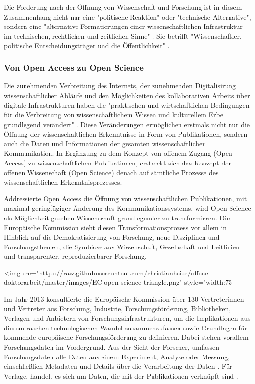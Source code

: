 Die Forderung nach der Öffnung von Wissenschaft und Forschung ist in diesem Zusammenhang nicht nur eine "politische Reaktion" oder "technische Alternative", sondern eine "alternative Formatierungen einer wissenschaftlichen Infrastruktur im technischen, rechtlichen und zeitlichen Sinne" \cite{kelty_2004}. Sie betrifft "Wissenschaftler, politische Entscheidungsträger und die Öffentlichkeit" \cite{Scheliga_2014}.

\subsubsection{Von Open Access zu Open Science}

Die zunehmenden Verbreitung des Internets, der zunehmenden Digitalisirung wissenschaftlicher Abläufe und den Möglichkeiten des kollaborativen Arbeits über digitale Infrastrukturen haben die "praktischen und wirtschaftlichen Bedingungen für die Verbreitung von wissenschaftlichem Wissen und kulturellem Erbe grundlegend verändert" \cite{berliner_erklaerung_2003}. Diese Veränderungen ermöglichen erstmals nicht nur die Öffnung der wissenschaftlichen Erkenntnisse in Form von Publikationen, sondern auch die Daten und Informationen der gesamten wissenschaftlicher Kommunikation. In Ergänzung zu dem Konzept von offenem Zugang (Open Access) zu wissenschaftlichen Publikationen, erstreckt sich das Konzept der offenen Wissenschaft (Open Science) denach auf sämtliche Prozesse des wissenschaftlichen Erkenntnisprozesses.

Addressierte Open Access die Öffnung von wissenschaftlichen Publikationen, mit maximal geringfügiger Änderung des Kommunikationssystems, wird Open Science als Möglichkeit gesehen Wissenschaft grundlegender zu transformieren. Die Europäische Kommission sieht diesen Transformationsprozess vor allem in Hinblick auf die Demokratisierung von Forschung, neue Disziplinen und Forschungsthemen, die Symbiose aus Wissenschaft, Gesellschaft und Leitlinien und transparenter, reproduzierbarer Forschung.

<img src="https://raw.githubusercontent.com/christianheise/offene-doktorarbeit/master/images/EC-open-science-triangle.png" style="width:75%

Im Jahr 2013 konsultierte die Europäische Kommission über 130 Vertreterinnen und Vertreter aus Forschung, Industrie, Forschungsförderung, Bibliotheken, Verlagen und Anbietern von Forschungsinfrastrukturen, um die Implikationen aus diesem raschen technologischen Wandel zusammenzufassen sowie Grundlagen für kommende europäische Forschungsförderung zu definieren. Dabei stehen vorallem Forschungsdaten im Vordergrund. Aus der Sicht der Forscher, umfassen Forschungsdaten alle Daten aus einem Experiment, Analyse oder Messung, einschließlich Metadaten und Details über die Verarbeitung der Daten \cite{eu_consult_data_2013}. Für Verlage, handelt es sich um Daten, die mit der  Publikationen verknüpft sind \cite{eu_consult_data_2013}.

